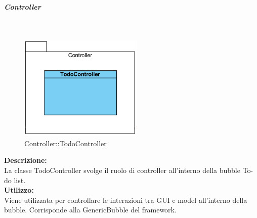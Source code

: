\subparagraph{Controller}\mbox{}
\begin{samepage}
	\label{todo-controller}\mbox{}\\
	\nopagebreak
	\begin{figure}[H]
		\centering
		\includegraphics[height=5cm]{diagrammi_img/classi_e_package/todo_controller}
		\caption{Controller\-::Todo\-Controller}
	\end{figure}
\end{samepage}
\textbf{Descrizione:}\\ \nopagebreak
La classe TodoController svolge il ruolo di controller all'interno della bubble To-do list. \\
\textbf{Utilizzo:}\\ \nopagebreak
Viene utilizzata per controllare le interazioni tra GUI e model all'interno della bubble. Corrisponde alla GenericBubble del framework. \\